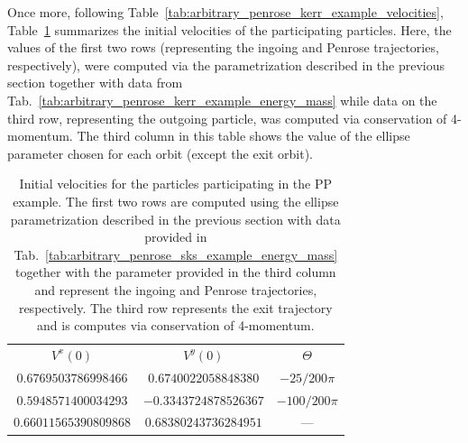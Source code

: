 Once more, following Table~\ref{tab:arbitrary_penrose_kerr_example_velocities}, Table~\ref{tab:arbitrary_penrose_sks_example_velocities} summarizes the initial velocities of the participating particles. Here, the values of the first two rows (representing the ingoing and Penrose trajectories, respectively), were computed via the parametrization described in the previous section together with data from Tab.~\ref{tab:arbitrary_penrose_kerr_example_energy_mass} while data on the third row, representing the outgoing particle, was computed via conservation of 4-momentum. The third column in this table shows the value of the ellipse parameter chosen for each orbit (except the exit orbit).
%
\begin{table}[]
  \centering
  \begin{tabular}{ccc}
    \hline\hline
    $V^x(0)$              & $V^y(0)$              & $\Theta$       \\
    $0.6769503786998466$  & $0.6740022058848380$  & $-25/200 \pi$  \\
    $0.5948571400034293$  & $-0.3343724878526367$ & $-100/200 \pi$ \\
    $0.66011565390809868$ & $0.68380243736284951$ & ---            \\ \hline\hline
  \end{tabular}
  \caption{Initial velocities for the particles participating in the PP example. The first two rows are computed using the ellipse parametrization described in the previous section with data provided in Tab.~\ref{tab:arbitrary_penrose_sks_example_energy_mass} together with the parameter provided in the third column and represent the ingoing and Penrose trajectories, respectively. The third row represents the exit trajectory and is computes via conservation of 4-momentum.}
  \label{tab:arbitrary_penrose_sks_example_velocities}
\end{table}


